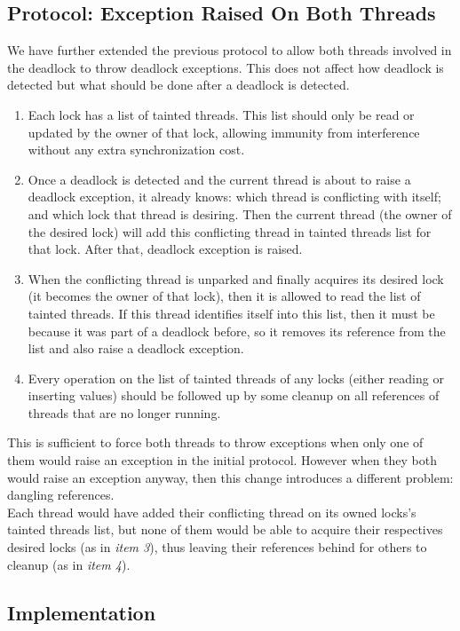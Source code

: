 \subsection{Protocol: Exception Raised On Both Threads}
We have further extended the previous protocol to allow both threads involved in the deadlock to throw deadlock exceptions. This does not affect how deadlock is detected but what should be done after a deadlock is detected.
\begin{enumerate}
\item Each lock has a list of tainted threads. This list should only be read or updated by the owner of that lock, allowing immunity from interference without any extra synchronization cost.
\item Once a deadlock is detected and the current thread is about to raise a deadlock exception, it already knows: which thread is conflicting with itself; and which lock that thread is desiring. Then the current thread (the owner of the desired lock) will add this conflicting thread in tainted threads list for that lock. After that, deadlock exception is raised.
\item When the conflicting thread is unparked and finally acquires its desired lock (it becomes the owner of that lock), then it is allowed to read the list of tainted threads. If this thread identifies itself into this list, then it must be because it was part of a deadlock before, so it removes its reference from the list and also raise a deadlock exception.
\item Every operation on the list of tainted threads of any locks (either reading or inserting values) should be followed up by some cleanup on all references of threads that are no longer running.
\end{enumerate}

This is sufficient to force both threads to throw exceptions when only one of them would raise an exception in the initial protocol.
However when they both would raise an exception anyway, then this change introduces a different problem: dangling references.\\
Each thread would have added their conflicting thread on its owned locks's tainted threads list,
but none of them would be able to acquire their respectives desired locks (as in \emph{item 3}),
thus leaving their references behind for others to cleanup (as in \emph{item 4}). 

\subsection{Implementation}

